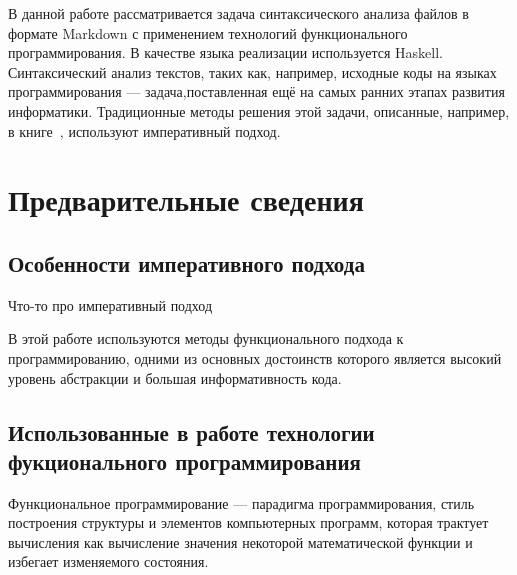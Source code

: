 



\newcommand\todo[1]{\textcolor{red}{#1}} 

\newcommand\sep{\rule{4cm}{0.4pt}}

\usepackage{float}



\Intro
В данной работе рассматривается задача синтаксического анализа
файлов в формате Markdown с применением технологий функционального
программирования. В качестве языка реализации используется Haskell.
Синтаксический анализ текстов, таких как, например, исходные коды на языках программирования --- задача,поставленная ещё на самых ранних этапах развития информатики. Традиционные методы решения этой задачи, описанные, например, в книге~\autocite{DragonBook2}, используют императивный подход. 

\section{Предварительные сведения}

\subsection{Особенности императивного подхода}

Что-то про императивный подход

В этой работе используются методы функционального подхода к программированию, одними из основных достоинств которого является высокий уровень абстракции и большая информативность кода.

\subsection{Использованные в работе технологии фукционального программирования}

Функциональное программирование --- парадигма программирования, стиль построения структуры и элементов компьютерных программ, которая трактует вычисления как вычисление значения некоторой математической функции и избегает изменяемого состояния.


